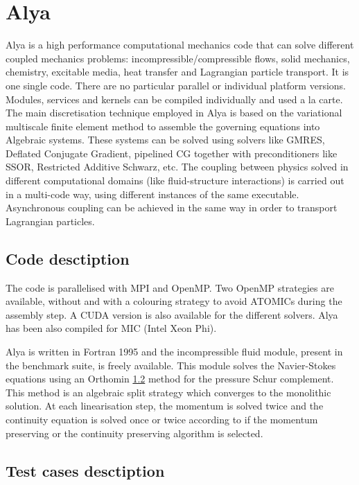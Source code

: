 \section{Alya}
Alya is a high performance computational mechanics code that can solve different coupled mechanics problems: incompressible/compressible flows, solid mechanics, chemistry, excitable media, heat transfer and Lagrangian particle transport. It is one single code. There are no particular parallel or individual platform versions. Modules, services and kernels can be compiled individually and used a la carte. The main discretisation technique employed in Alya is based on the variational multiscale finite element method to assemble the governing equations into Algebraic systems. These systems can be solved using solvers like GMRES, Deflated Conjugate Gradient, pipelined CG together with preconditioners like SSOR, Restricted Additive Schwarz, etc. The coupling between physics solved in different computational domains (like fluid-structure interactions) is carried out in a multi-code way, using different instances of the same executable. Asynchronous coupling can be achieved in the same way in order to transport Lagrangian particles.

\subsection{Code desctiption}
The code is parallelised with MPI and OpenMP. Two OpenMP strategies are available, without and with a colouring strategy to avoid ATOMICs during the assembly step. A CUDA version is also available for the different solvers. Alya has been also compiled for MIC (Intel Xeon Phi).

Alya is written in Fortran 1995 and the incompressible fluid module, present in the benchmark suite, is freely available. This module solves the Navier-Stokes equations using an Orthomin \ref{} method for the pressure Schur complement. This method is an algebraic split strategy which converges to the monolithic solution. At each linearisation step, the momentum is solved twice and the continuity equation is solved once or twice according to if the momentum preserving or the continuity preserving algorithm is selected.

\subsection{Test cases desctiption}
